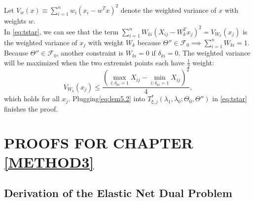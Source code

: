     Let $V_{w}(x)\equiv\sum_{i=1}^nw_{i}\left(x_i-w^Tx\right)^2$ denote the weighted variance of $x$ with weights $w$.\\
    In \eqref{eq:tstar}, we can see that the term $\sum_{i=1}^nW_{ki}\left( X_{ij}-W_k^Tx_j\right)^2=V_{W_k}(x_j)$ is the weighted variance of $x_j$ with weight $W_k$ because $\Theta''\in\mathcal{F}_{0}\implies\sum_{i=1}^nW_{ki}=1$. Because $\Theta''\in\mathcal{F}_{0}$, another constraint is $W_{ki}=0$ if $\delta_{ki}=0$. The weighted variance will be maximized when the two extremist points each have $\frac{1}{2}$ weight:
    \begin{equation}
        \label{eq:lem5.2}
        V_{W_k}(x_j)\leq \frac{\left(\max_{i:\delta_{ki}=1}X_{ij}-\min_{i:\delta_{ki}=1}X_{ij}\right)^2}{4},
    \end{equation}
    which holds for all $x_j$. Plugging\eqref{eq:lem5.2} into $T^*_{\xi,j}(\lambda_1,\lambda_0;\Theta_{0},\Theta'')$ in \eqref{eq:tstar} finishes the proof.
    
\chapter{PROOFS FOR CHAPTER \ref{METHOD3}}
\section{Derivation of the Elastic Net Dual Problem}
\label{sec:duale}

